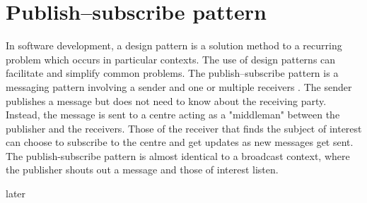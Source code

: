 \section{Publish–subscribe pattern}
\label{chap:pubsub}
In software development, a design pattern is a solution method to a recurring problem which occurs in particular contexts. The use of design patterns can facilitate and simplify common problems. The publish–subscribe pattern is a messaging pattern involving a sender and one or multiple receivers \cite{pus_sub}. The sender publishes a message but does not need to know about the receiving party. Instead, the message is sent to a centre acting as a "middleman" between the publisher and the receivers. Those of the receiver that finds the subject of interest can choose to subscribe to the centre and get updates as new messages get sent. The publish-subscribe pattern is almost identical to a broadcast context, where the publisher shouts out a message and those of interest listen. 


later \cite{observer}


